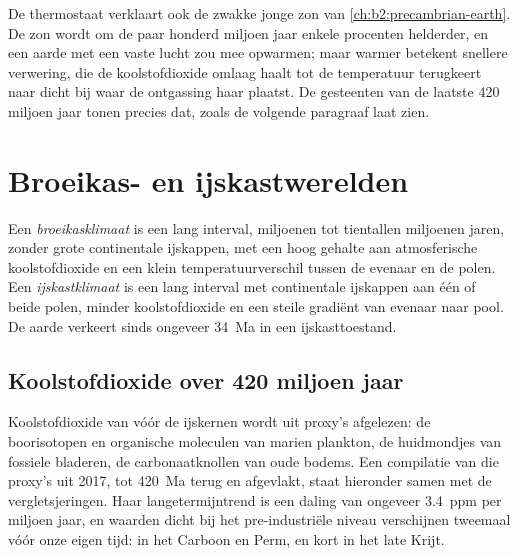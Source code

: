 De thermostaat verklaart ook de zwakke jonge zon van \cref{ch:b2:precambrian-earth}. De zon wordt
om de paar honderd miljoen jaar enkele procenten helderder, en een aarde met een vaste lucht zou mee opwarmen;
maar warmer betekent snellere verwering, die de koolstofdioxide omlaag haalt tot de temperatuur
terugkeert naar dicht bij waar de ontgassing haar plaatst. De gesteenten van de laatste 420 miljoen jaar tonen precies
dat, zoals de volgende paragraaf laat zien.

\section{Broeikas- en ijskastwerelden}\label{sec:b2:deep-time-climate:states}

\begin{definition}\label{def:b2:deep-time-climate:states}
Een \emph{broeikasklimaat} is een lang interval, miljoenen tot
tientallen miljoenen jaren, zonder grote continentale ijskappen, met een hoog gehalte aan atmosferische
koolstofdioxide en een klein temperatuurverschil tussen de evenaar en de polen. Een
\emph{ijskastklimaat} is een lang interval met continentale ijskappen aan één
of beide polen, minder koolstofdioxide en een steile gradiënt van evenaar naar pool. De aarde verkeert sinds
ongeveer \qty{34}{Ma} in een ijskasttoestand.
\end{definition}

\subsection*{Koolstofdioxide over 420 miljoen jaar}

Koolstofdioxide van vóór de ijskernen wordt uit proxy's afgelezen: de boorisotopen en organische moleculen
van marien plankton, de huidmondjes van fossiele bladeren, de carbonaatknollen van oude bodems. Een compilatie
van die proxy's uit 2017, tot \qty{420}{Ma} terug en afgevlakt, staat hieronder samen met de vergletsjeringen. Haar
langetermijntrend is een daling van ongeveer \qty{3.4}{ppm} per miljoen jaar, en waarden dicht bij het
pre-industriële niveau verschijnen tweemaal vóór onze eigen tijd: in het Carboon en Perm, en
kort in het late Krijt.

